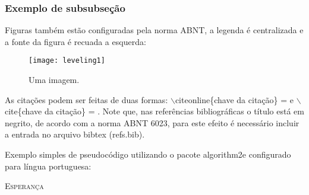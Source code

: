 \documentclass[courier]{uninove-ppgi}
\begin{document}
\subsubsection{Exemplo de subsubseção}

Figuras também estão configuradas pela norma ABNT, a legenda é centralizada e a fonte da figura é recuada a esquerda:

\begin{figure}[ht!]

	\begin{center}
	
		\texttt{[image: leveling1]}
	
	\end{center}
	
	\caption{Uma imagem.}
	
	
\end{figure}

As citações podem ser feitas de duas formas: {\color{red}$\backslash$citeonline}\{chave da citação\} =  e {\color{red}$\backslash$cite}\{chave da citação\} = \cite{seymor:book:1971}. Note que, nas referências bibliográficas o título está em negrito, de acordo com a norma ABNT 6023, para este efeito é necessário incluir a entrada no arquivo bibtex (refs.bib).

Exemplo simples de pseudocódigo utilizando o pacote {\color{red}algorithm2e} configurado para língua portuguesa:

\begin{algorithm}[H]
\SetAlgoLined
{} 
\label{alg1}
\caption{\textsc{Esperança}}
\end{algorithm}



		   
\end{document}
